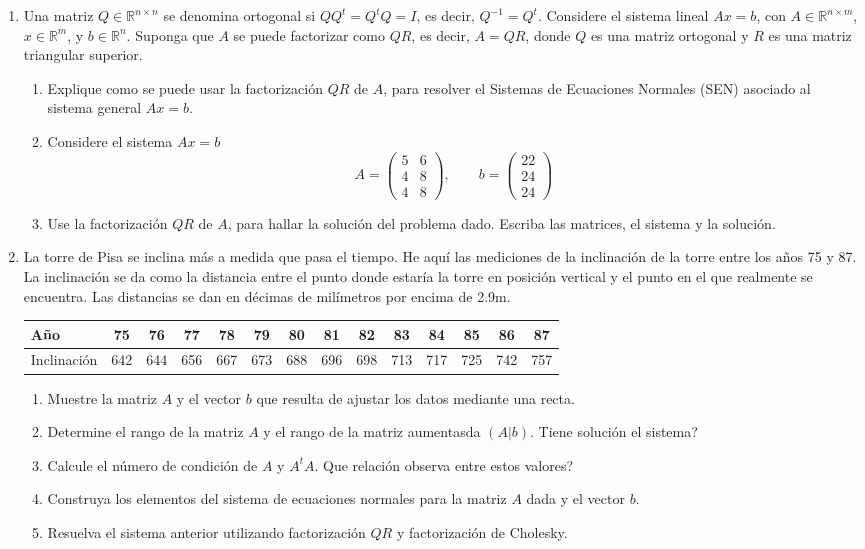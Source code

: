 \documentclass[12pt,letterpaper]{article}
\theoremstyle{plain}
\begin{document}
\begin{enumerate}
\item Una matriz $Q \in \mathbb{R}^{n \times n}$ se denomina ortogonal si $QQ^t=Q^tQ=I$, es decir, $Q^{-1}=Q^t$. Considere el sistema lineal $Ax=b$, con $A \in \mathbb{R}^{n \times m}$, $x \in \mathbb{R}^m$,  y $b \in \mathbb{R}^n$. Suponga que $A$ se puede factorizar como $QR$, es decir, $A=QR$, donde $Q$ es una matriz ortogonal y $R$ es una matriz triangular superior.
\begin{enumerate}
 \item Explique como se puede usar la factorizaci\'on $QR$ de $A$, para resolver el Sistemas de Ecuaciones Normales (SEN) asociado al sistema general $Ax=b$.
 \item Considere el sistema $Ax=b$
$$
A=\left(\begin{array}{cc}
      5 & 6 \\
      4 & 8 \\
      4 & 8  
      \end{array}\right), \qquad  b=\left(\begin{array}{c}
      22 \\
      24 \\
      24  
      \end{array}\right)
$$
\item Use la factorizaci\'on $QR$ de $A$, para hallar la soluci\'on del problema dado. Escriba las matrices, el sistema y la soluci\'on.
\end{enumerate}

\item La torre de Pisa se inclina m\'as a medida que pasa el tiempo. He aqu\'i las mediciones de la inclinaci\'on de la torre entre los a\~nos 75 y 87. La inclinaci\'on se da como la distancia entre el punto donde estar\'ia la torre en posici\'on vertical y el punto en el que realmente se encuentra. Las distancias se dan en d\'ecimas de mil\'imetros por encima de 2.9m.

\begin{tabular}{|l|c|c|c|c|c|c|c|c|c|c|c|c|c|}\hline
 A\~no & 75 & 76 & 77 & 78 & 79 & 80 & 81 & 82 & 83 & 84 & 85 & 86 & 87\\\hline
 Inclinaci\'on & 642 & 644 & 656 & 667 & 673 & 688 & 696 & 698 & 713 & 717 & 725 & 742 & 757\\\hline
\end{tabular}

\begin{enumerate}
 \item Muestre la matriz $A$ y el vector $b$ que resulta de ajustar los datos mediante una recta.
\item Determine el rango de la matriz $A$ y el rango de la matriz aumentasda $(A|b)$. Tiene soluci\'on el sistema?
\item Calcule el n\'umero de condici\'on de $A$ y $A^tA$. Que relaci\'on observa entre estos valores?
\item Construya los elementos del sistema de ecuaciones normales para la matriz $A$ dada y el vector $b$.
\item Resuelva el sistema anterior utilizando factorizaci\'on $QR$ y factorizaci\'on  de Cholesky.
\end{enumerate}


\end{enumerate}
\end{document}
